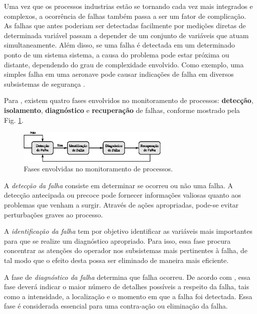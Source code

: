 Uma vez que os processos industrias estão se tornando cada vez mais integrados e
complexos, a ocorrência de falhas também passa a ser um fator de complicação. As
falhas que antes poderiam ser detectadas facilmente por medições diretas de
determinada variável passam a depender de um conjunto de variáveis que atuam
simultaneamente. Além disso, se uma falha é detectada em um determinado ponto de
um sistema sistema, a causa do problema pode estar próxima ou distante,
dependendo do grau de complexidade envolvido. Como exemplo, uma simples falha em
uma aeronave pode causar indicações de falha em diversos subsistemas de
segurança \cite{vach:2006}.

Para , existem quatro fases envolvidos no monitoramento
de processos: {\bf detecção}, {\bf isolamento}, {\bf diagnóstico} e {\bf
recuperação} de falhas, conforme mostrado pela Fig.
\ref{fig:fases_monitoramento}.

\begin{figure}[htb]
\centering
    \includegraphics[width=0.65\textwidth]{imgs/aspectos/eps/fases_monitoramento}
    \caption{Fases envolvidas no monitoramento de processos.}
    \label{fig:fases_monitoramento}
\end{figure}

A {\it detecção da falha} consiste em determinar se ocorreu ou não uma falha. A
detecção antecipada ou precoce pode fornecer informações valiosas quanto aos
problemas que venham a surgir. Através de ações apropriadas, pode-se evitar
perturbações graves ao processo.

A {\it identificação da falha} tem por objetivo identificar as variáveis mais
importantes para que se realize um diagnóstico apropriado. Para isso, essa fase
procura concentrar as atenções do operador nos subsistemas mais pertinentes à
falha, de tal modo que o efeito desta possa ser eliminado de maneira mais
eficiente.

A fase de {\it diagnóstico da falha} determina que falha ocorreu. De acordo com
, essa fase deverá indicar o maior número de detalhes
possíveis a respeito da falha, tais como a intensidade, a localização e o
momento em que a falha foi detectada. Essa fase é considerada essencial para uma
contra-ação ou eliminação da falha.

